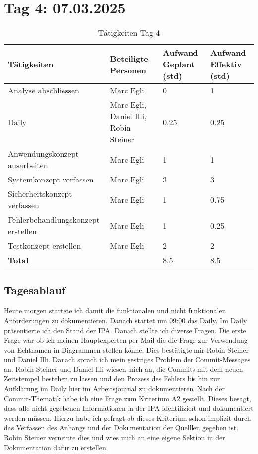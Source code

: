 \section{Tag 4: 07.03.2025}
\begin{table}[H]
    \begin{tabular}{|L{0.4\textwidth}|C{60pt}|C{60pt}|C{60pt}|}
        \hline
        \color{white}Tätigkeiten & \color{white}Beteiligte \color{white}Personen & \color{white}Aufwand Geplant (std) & \color{white}Aufwand Effektiv (std) \\
        \hline
        Analyse abschliessen & Marc Egli & 0 & 1 \\
        \hline
        Daily & Marc Egli, Daniel Illi, Robin Steiner & 0.25 & 0.25 \\
        \hline
        Anwendungskonzept ausarbeiten & Marc Egli & 1 & 1 \\
        \hline
        Systemkonzept verfassen & Marc Egli & 3 & 3 \\
        \hline
        Sicherheitskonzept verfassen & Marc Egli & 1 & 0.75 \\
        \hline
        Fehlerbehandlungskonzept erstellen & Marc Egli & 1 & 0.25 \\
        \hline
        Testkonzept erstellen & Marc Egli & 2 & 2 \\
        \hline
        \textbf{Total} &  & 8.5 & 8.5 \\
    \hline
    \end{tabular}
    \caption{Tätigkeiten Tag 4}
\end{table}

\subsection*{Tagesablauf}
Heute morgen startete ich damit die funktionalen und nicht funktionalen Anforderungen zu dokumentieren. 
Danach startet um 09:00 das Daily. Im Daily präsentierte ich den Stand der IPA. Danach stellte ich diverse Fragen. Die
erste Frage war ob ich meinen Hauptexperten per Mail die die Frage zur Verwendung von Echtnamen in Diagrammen stellen könne. Dies
bestätigte mir Robin Steiner und Daniel Illi. Danach sprach ich mein gestriges Problem der Commit-Messages an. Robin Steiner und Daniel Illi
wiesen mich an, die Commits mit dem neuen Zeitstempel bestehen zu lassen und den Prozess des Fehlers bis hin zur Aufklärung im Daily
hier im Arbeitsjournal zu dokumentieren. Nach der Commit-Thematik habe ich eine Frage zum Kriterium A2 gestellt. Dieses besagt, dass alle
nicht gegebenen Informationen in der IPA identifiziert und dokumentiert werden müssen. Hierzu habe ich gefragt ob dieses Kriterium schon implizit durch das
Verfassen des Anhangs und der Dokumentation der Quelllen gegeben ist. Robin Steiner verneinte dies und wies mich an eine eigene Sektion in der Dokumentation
dafür zu erstellen.

